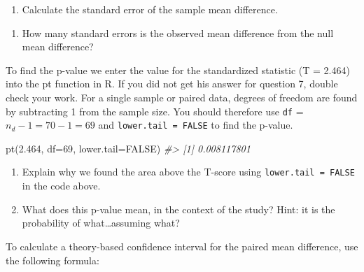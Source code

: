 \documentclass[
]{report}
\newenvironment{Shaded}{\begin{snugshade}}{\end{snugshade}}
\newcommand{\AttributeTok}[1]{\textcolor[rgb]{0.77,0.63,0.00}{#1}}
\newcommand{\CommentTok}[1]{\textcolor[rgb]{0.56,0.35,0.01}{\textit{#1}}}
\newcommand{\ConstantTok}[1]{\textcolor[rgb]{0.00,0.00,0.00}{#1}}
\newcommand{\DecValTok}[1]{\textcolor[rgb]{0.00,0.00,0.81}{#1}}
\newcommand{\FloatTok}[1]{\textcolor[rgb]{0.00,0.00,0.81}{#1}}
\newcommand{\FunctionTok}[1]{\textcolor[rgb]{0.00,0.00,0.00}{#1}}
\newcommand{\NormalTok}[1]{#1}
\providecommand{\tightlist}{%
  \setlength{\itemsep}{0pt}\setlength{\parskip}{0pt}}
\begin{document}
\begin{enumerate}
\def\labelenumi{\arabic{enumi}.}
\setcounter{enumi}{5}
\tightlist
\item
  Calculate the standard error of the sample mean difference.
\end{enumerate}

\vspace{0.5in}

\begin{enumerate}
\def\labelenumi{\arabic{enumi}.}
\setcounter{enumi}{6}
\tightlist
\item
  How many standard errors is the observed mean difference from the null mean difference?
\end{enumerate}

\vspace{0.5in}

To find the p-value we enter the value for the standardized statistic (T = 2.464) into the pt function in R. If you did not get his answer for question 7, double check your work. For a single sample or paired data, degrees of freedom are found by subtracting 1 from the sample size. You should therefore use \texttt{df} = \(n_d-1 = 70 - 1 = 69\) and \texttt{lower.tail\ =\ FALSE} to find the p-value.

\begin{Shaded}
\begin{Highlighting}[]
\FunctionTok{pt}\NormalTok{(}\FloatTok{2.464}\NormalTok{, }\AttributeTok{df=}\DecValTok{69}\NormalTok{, }\AttributeTok{lower.tail=}\ConstantTok{FALSE}\NormalTok{)}
\CommentTok{\#\textgreater{} [1] 0.008117801}
\end{Highlighting}
\end{Shaded}

\begin{enumerate}
\def\labelenumi{\arabic{enumi}.}
\setcounter{enumi}{7}
\item
  Explain why we found the area above the T-score using \texttt{lower.tail\ =\ FALSE} in the code above.
  \vspace{0.3in}
\item
  What does this p-value mean, in the context of the study? Hint: it is the probability of what\ldots assuming what?
  \vspace{0.8in}
\end{enumerate}

\newpage

To calculate a theory-based confidence interval for the paired mean difference, use the following formula:
\end{document}

